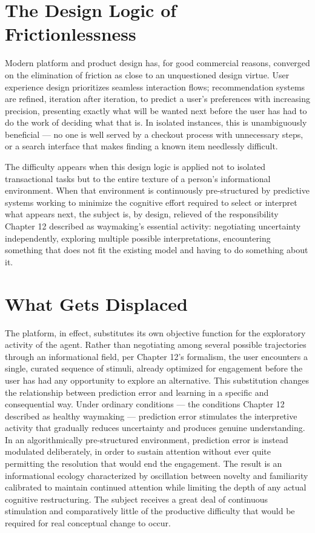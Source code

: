 \documentclass[12pt,a4paper]{book}
\begin{document}
\section{The Design Logic of Frictionlessness}

Modern platform and product design has, for good commercial reasons, converged on the elimination of friction as close to an unquestioned design virtue. User experience design prioritizes seamless interaction flows; recommendation systems are refined, iteration after iteration, to predict a user's preferences with increasing precision, presenting exactly what will be wanted next before the user has had to do the work of deciding what that is. In isolated instances, this is unambiguously beneficial — no one is well served by a checkout process with unnecessary steps, or a search interface that makes finding a known item needlessly difficult.

The difficulty appears when this design logic is applied not to isolated transactional tasks but to the entire texture of a person's informational environment. When that environment is continuously pre-structured by predictive systems working to minimize the cognitive effort required to select or interpret what appears next, the subject is, by design, relieved of the responsibility Chapter 12 described as waymaking's essential activity: negotiating uncertainty independently, exploring multiple possible interpretations, encountering something that does not fit the existing model and having to do something about it.

\section{What Gets Displaced}

The platform, in effect, substitutes its own objective function for the exploratory activity of the agent. Rather than negotiating among several possible trajectories through an informational field, per Chapter 12's formalism, the user encounters a single, curated sequence of stimuli, already optimized for engagement before the user has had any opportunity to explore an alternative. This substitution changes the relationship between prediction error and learning in a specific and consequential way. Under ordinary conditions — the conditions Chapter 12 described as healthy waymaking — prediction error stimulates the interpretive activity that gradually reduces uncertainty and produces genuine understanding. In an algorithmically pre-structured environment, prediction error is instead modulated deliberately, in order to sustain attention without ever quite permitting the resolution that would end the engagement. The result is an informational ecology characterized by oscillation between novelty and familiarity calibrated to maintain continued attention while limiting the depth of any actual cognitive restructuring. The subject receives a great deal of continuous stimulation and comparatively little of the productive difficulty that would be required for real conceptual change to occur.
\end{document}
